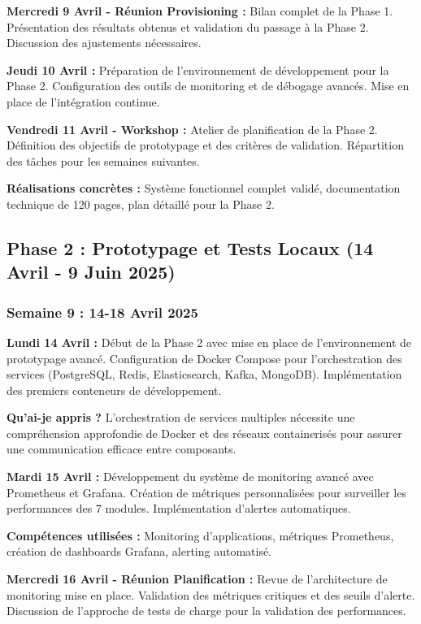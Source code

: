\documentclass[a4paper,12pt]{article}
\begin{document}
\textbf{Mercredi 9 Avril - Réunion Provisioning :}
Bilan complet de la Phase 1. Présentation des résultats obtenus et validation du passage à la Phase 2. Discussion des ajustements nécessaires.

\textbf{Jeudi 10 Avril :}
Préparation de l'environnement de développement pour la Phase 2. Configuration des outils de monitoring et de débogage avancés. Mise en place de l'intégration continue.

\textbf{Vendredi 11 Avril - Workshop :}
Atelier de planification de la Phase 2. Définition des objectifs de prototypage et des critères de validation. Répartition des tâches pour les semaines suivantes.

\textbf{Réalisations concrètes :} Système fonctionnel complet validé, documentation technique de 120 pages, plan détaillé pour la Phase 2.

\subsection{Phase 2 : Prototypage et Tests Locaux (14 Avril - 9 Juin 2025)}

\subsubsection{Semaine 9 : 14-18 Avril 2025}

\textbf{Lundi 14 Avril :}
Début de la Phase 2 avec mise en place de l'environnement de prototypage avancé. Configuration de Docker Compose pour l'orchestration des services (PostgreSQL, Redis, Elasticsearch, Kafka, MongoDB). Implémentation des premiers conteneurs de développement.

\textbf{Qu'ai-je appris ?} L'orchestration de services multiples nécessite une compréhension approfondie de Docker et des réseaux containerisés pour assurer une communication efficace entre composants.

\textbf{Mardi 15 Avril :}
Développement du système de monitoring avancé avec Prometheus et Grafana. Création de métriques personnalisées pour surveiller les performances des 7 modules. Implémentation d'alertes automatiques.

\textbf{Compétences utilisées :} Monitoring d'applications, métriques Prometheus, création de dashboards Grafana, alerting automatisé.

\textbf{Mercredi 16 Avril - Réunion Planification :}
Revue de l'architecture de monitoring mise en place. Validation des métriques critiques et des seuils d'alerte. Discussion de l'approche de tests de charge pour la validation des performances.
\end{document}
